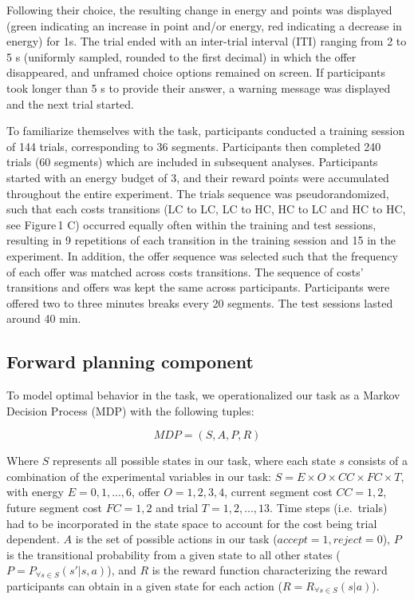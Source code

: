 \documentclass[
  letterpaper,
  DIV=11,
  numbers=noendperiod]{scrartcl}
\begin{document}
Following their choice, the resulting change in energy and points was
displayed (green indicating an increase in point and/or energy, red
indicating a decrease in energy) for 1s. The trial ended with an
inter-trial interval (ITI) ranging from 2 to 5 s (uniformly sampled,
rounded to the first decimal) in which the offer disappeared, and
unframed choice options remained on screen. If participants took longer
than 5 s to provide their answer, a warning message was displayed and
the next trial started.

To familiarize themselves with the task, participants conducted a
training session of 144 trials, corresponding to 36 segments.
Participants then completed 240 trials (60 segments) which are included
in subsequent analyses. Participants started with an energy budget of 3,
and their reward points were accumulated throughout the entire
experiment. The trials sequence was pseudorandomized, such that each
costs transitions (LC to LC, LC to HC, HC to LC and HC to HC, see
Figure\,1 C) occurred equally often within the training and test
sessions, resulting in 9 repetitions of each transition in the training
session and 15 in the experiment. In addition, the offer sequence was
selected such that the frequency of each offer was matched across costs
transitions. The sequence of costs' transitions and offers was kept the
same across participants. Participants were offered two to three minutes
breaks every 20 segments. The test sessions lasted around 40 min.

\subsection{Forward planning
component}\label{sec-forward_planning_component}

To model optimal behavior in the task, we operationalized our task as a
Markov Decision Process (MDP) with the following tuples:

\[
MDP = (S, A, P, R)
\]

Where \(S\) represents all possible states in our task, where each state
\(s\) consists of a combination of the experimental variables in our
task: \(S=E \times O \times CC \times FC \times T\), with energy
\(E={0, 1, ..., 6}\), offer \(O={1, 2, 3, 4}\), current segment cost
\(CC={1, 2}\), future segment cost \(FC={1, 2}\) and trial
\(T={1, 2,..., 13}\). Time steps (i.e.~trials) had to be incorporated in
the state space to account for the cost being trial dependent. \(A\) is
the set of possible actions in our task (\(accept=1, reject=0\)), \(P\)
is the transitional probability from a given state to all other states
(\(P=P_{\forall s \in S}(s'|s, a)\)), and \(R\) is the reward function
characterizing the reward participants can obtain in a given state for
each action (\(R=R_{\forall s \in S}(s|a)\)).
\end{document}
